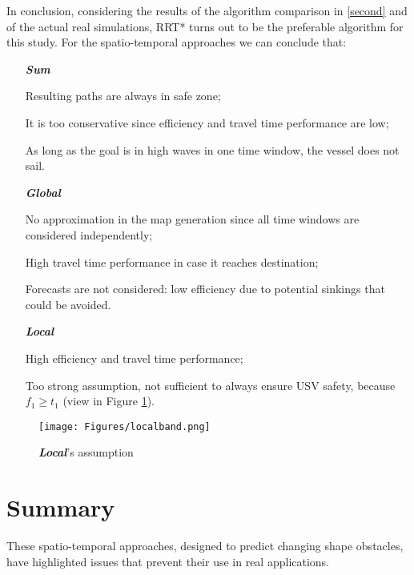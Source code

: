 In conclusion, considering the results of the algorithm comparison in \autoref{second} and of the actual real simulations, RRT* turns out to be the preferable algorithm for this study. %
For the spatio-temporal approaches we can conclude that:
\begin{itemize}[itemsep=0pt]
	\item [\textbf{\textit{Sum}}]
	\item[\color{green}{\cmark}] Resulting paths are always in safe zone;
	\item[\color{red}{\xmark}] It is too conservative since efficiency and travel time performance are low;
	\item[\color{red}{\xmark}] As long as the goal is in high waves in one time window, the vessel does not sail.
	\item [\textbf{\textit{Global}}]
	\item[\color{green}{\cmark}] No approximation in the map generation since all time windows are considered independently;
	\item[\color{green}{\cmark}] High travel time performance in case it reaches destination;
	\item[\color{red}{\xmark}] Forecasts are not considered: low efficiency due to potential sinkings that could be avoided. 
	\item[\textbf{\textit{Local}}]
	\item[\color{green}{\cmark}] High efficiency and travel time performance;
	\item[\color{red}{\xmark}] Too strong assumption, not sufficient to always ensure USV safety, because $f_1 \geq t_1$ (view in Figure \ref{localassumption}).
\end{itemize}
\begin{figure}[h]
\centering
\texttt{[image: Figures/localband.png]}
\caption{\textbf{\textit{Local}}'s assumption}
\label{localassumption}
\end{figure}
\section{Summary}
These spatio-temporal approaches, designed to predict changing shape obstacles, have highlighted issues that prevent their use in real applications.

